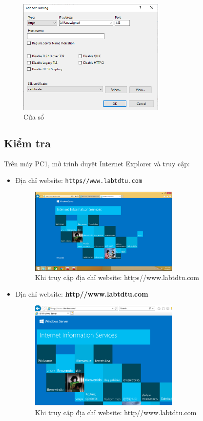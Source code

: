 \documentclass[13pt]{report}
\begin{document}
\begin{itemize}
\begin{itemize}
\begin{figure}[htp]
				\centering
				\includegraphics[width=0.65\textwidth]{image/Gui/Https02.png}
				\caption{Cửa sổ}
			\end{figure}
		\end{itemize}
	\end{itemize}
	\newpage
	\subsection{Kiểm tra}
	Trên máy PC1, mở trình duyệt Internet Explorer và truy cập:
	\begin{itemize}
		\item Địa chỉ website: \texttt{https//www.labtdtu.com}
		\begin{figure}[htp]
			\centering
			\includegraphics[width=0.7\textwidth]{image/Gui/Test/1.png}
			\caption{Khi truy cập địa chỉ website: https//www.labtdtu.com}
		\end{figure}
		\item Địa chỉ website: \textbf{http//www.labtdtu.com}
		\begin{figure}[htp]
			\centering
			\includegraphics[width=0.7\textwidth]{image/Gui/Test/2.png}
			\caption{Khi truy cập địa chỉ website: http//www.labtdtu.com}
		\end{figure}
	\end{itemize}
	\newpage
\end{document}
